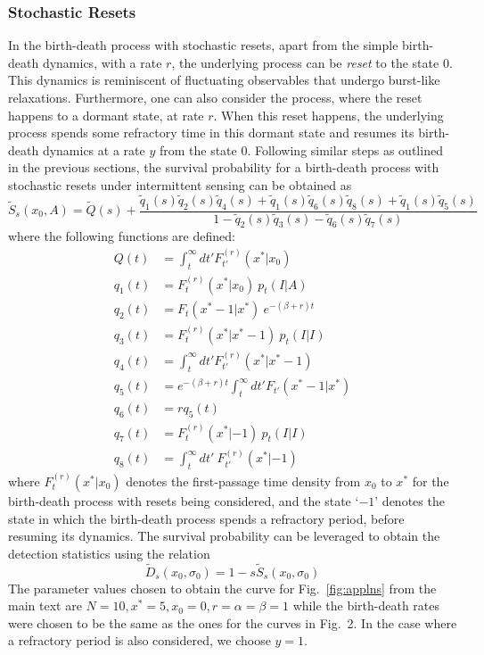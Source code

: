 \subsubsection*{Stochastic Resets}
In the birth-death process with stochastic resets, apart from the simple birth-death dynamics, with a rate $r$, the underlying process can be \emph{reset} to the state $0$. This dynamics is reminiscent of fluctuating observables that undergo burst-like relaxations. Furthermore, one can also consider the process, where the reset happens to a dormant state, at rate $r$. When this reset happens, the underlying process spends some refractory time in this dormant state and resumes its birth-death dynamics at a rate $y$ from the state $0$.
Following similar steps as outlined in the previous sections, the survival probability for a birth-death process with stochastic resets under intermittent sensing can be obtained as 
 \begin{equation}
      \widetilde{S}_s(x_0,A) = \widetilde{Q}(s) + \frac{\widetilde{q}_1(s)\widetilde{q}_2(s)\widetilde{q}_4(s)+\widetilde{q}_1(s)\widetilde{q}_6(s)\widetilde{q}_8(s)+\widetilde{q}_1(s)\widetilde{q}_5(s)}{1- \widetilde{q}_2(s)\widetilde{q}_3(s)-\widetilde{q}_6(s)\widetilde{q}_7(s)}
 \end{equation}
where the following functions are defined:
  \begin{align}
  Q(t)    &= \int_{t}^{\infty} dt' F^{(r)}_{t'}(x^*|x_0)\\
  q_{1}(t) &= F^{(r)}_t(x^*|x_0)\ p_t(I|A)\\
  q_{2}(t) &= F_t(x^*-1|x^*)\ e^{-(\beta + r)  t}\\
  q_{3}(t) &= F^{(r)}_t(x^*|x^*-1)\ p_t(I|I)\\
  q_{4}(t) &= \int_{t}^{\infty} dt' F^{(r)}_{t'}(x^*|x^*-1)\\
  q_{5}(t) &= e^{-(\beta+r) t} \int_{t}^{\infty} dt' F_{t'}(x^*-1|x^*)\\
  q_{6}(t) &= r q_5(t)\\
  q_{7}(t) &= F^{(r)}_t(x^*|-1)\ p_t(I|I)\\
  q_{8}(t) &= \int_{t}^{\infty} dt'~ F^{(r)}_{t'}(x^*|-1) 
 \end{align}
where $F^{(r)}_{t}(x^*|x_0)$ denotes the first-passage time density from $x_0$ to $x^*$ for the birth-death process with resets being considered, and the state `$-1$' denotes the state in which the birth-death process spends a refractory period, before resuming its dynamics. The survival probability can be leveraged to obtain the  detection statistics using the relation
\begin{equation}
    \widetilde{D}_s(x_0,\sigma_0)  = 1- s\widetilde{S}_s(x_0,\sigma_0)
\end{equation}
The parameter values chosen to obtain the curve for Fig.~\ref{fig:applns} from the main text are $N=10, x^*=5, x_0 = 0, r=\alpha=\beta=1$ while the birth-death rates were chosen to be the same as the ones for the curves in Fig.~2. In the case where a refractory period is also considered, we choose $y=1$. 

